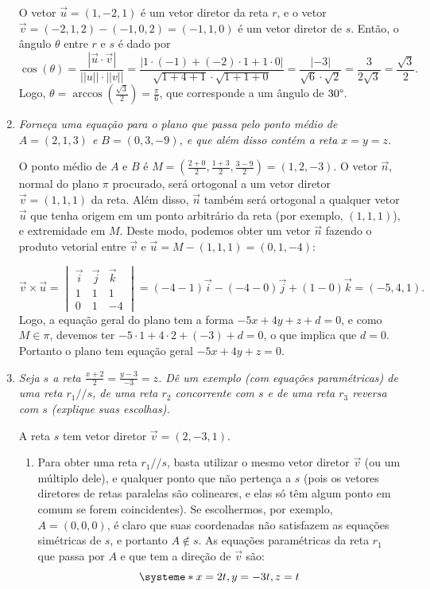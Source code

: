 \documentclass[12pt,a4paper]{article}
\newcommand{\norm}[1]{\left|\left|{#1}\right|\right|}
\begin{document}
\begin{enumerate}
O vetor $\vec{u} = (1,-2,1)$ é um vetor diretor da reta $r$, e o vetor $\vec{v} = (-2,1,2) - (-1,0,2) = (-1,1,0)$ é um vetor diretor de $s$. Então, o ângulo $\theta$ entre $r$ e $s$ é dado por
\[
\cos(\theta)
= \frac{|\vec{u} \cdot \vec{v}|}{\norm{u} \cdot \norm{v}}
= \frac{|1 \cdot (-1) + (-2) \cdot 1 + 1 \cdot 0|}
       {\sqrt{1 + 4 + 1} \cdot \sqrt{1+1+0}}
= \frac{|-3|}{\sqrt{6} \cdot \sqrt{2}}
= \frac{3}{2\sqrt{3}}
= \frac{\sqrt{3}}{2}.
\]
Logo, $\theta = \operatorname{arccos}(\frac{\sqrt{3}}{2}) = \frac{\pi}{6}$, que corresponde a um ângulo de $30\degree$.

\item \textit{ Forneça uma equação para o plano que passa pelo ponto médio de $A = (2, 1, 3)$ e $B = (0, 3, -9)$, e que além disso contém a reta $x = y = z$. }

O ponto médio de $A$ e $B$ é $M = \left(\frac{2+0}{2}, \frac{1+3}{2}, \frac{3-9}{2}\right) = (1,2,-3)$. O vetor $\vec{n}$, normal do plano $\pi$ procurado, será ortogonal a um vetor diretor $\vec{v} = (1,1,1)$ da reta. Além disso, $\vec{n}$ também será ortogonal a qualquer vetor $\vec{u}$ que tenha origem em um ponto arbitrário da reta (por exemplo, $(1,1,1)$), e extremidade em $M$. Deste modo, podemos obter um vetor $\vec{n}$ fazendo o produto vetorial entre $\vec{v}$ e $\vec{u} = M - (1,1,1) = (0,1,-4)$:

\[
\vec{v} \times \vec{u} =
\begin{vmatrix}
\vec{i} & \vec{j} & \vec{k} \\
1 & 1 & 1 \\
0 & 1 & -4
\end{vmatrix}
= (-4 -1) \vec{i} - (-4 - 0) \vec{j} + (1 - 0) \vec{k}
= (-5, 4, 1).
\]
Logo, a equação geral do plano tem a forma $-5x + 4y + z + d = 0$, e como $M \in \pi$, devemos ter $-5 \cdot 1 + 4\cdot 2 + (-3) + d = 0$, o que implica que $d = 0$. Portanto o plano tem equação geral $-5x + 4y + z = 0$.

\item \textit{ Seja $s$ a reta $\frac{x + 2}{2} = \frac{y - 3}{-3} = z$. Dê um exemplo (com equações paramétricas) de uma reta $r_1 // s$, de uma reta $r_2$ concorrente com $s$ e de uma reta $r_3$ reversa com $s$ (explique suas escolhas). }

A reta $s$ tem vetor diretor $\vec{v} = (2,-3,1)$.
\begin{enumerate}
\item Para obter uma reta $r_1 // s$, basta utilizar o mesmo vetor diretor $\vec{v}$ (ou um múltiplo dele), e qualquer ponto que não pertença a $s$ (pois os vetores diretores de retas paralelas são colineares, e elas só têm algum ponto em comum se forem coincidentes). Se escolhermos, por exemplo, $A = (0,0,0)$, é claro que suas coordenadas não satisfazem as equações simétricas de $s$, e portanto $A \not\in s$. As equações paramétricas da reta $r_1$ que passa por $A$ e que tem a direção de $\vec{v}$ são:
\[
\systeme*{
x = 2t,
y = -3t,
z = t
}
\]


\end{enumerate}
\end{enumerate}
\end{document}

